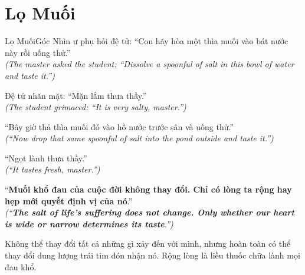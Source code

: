 \section{Lọ Muối}
\begin{truyen}{Lọ Muối}{Góc Nhìn}
ư phụ hỏi đệ tử: ``Con hãy hòa một thìa muối vào bát nước này rồi uống thử.''\\
\textit{(The master asked the student: ``Dissolve a spoonful of salt in this bowl of water and taste it.'')}

Đệ tử nhăn mặt: ``Mặn lắm thưa thầy.''\\
\textit{(The student grimaced: ``It is very salty, master.'')}

``Bây giờ thả thìa muối đó vào hồ nước trước sân và uống thử.''\\
\textit{(``Now drop that same spoonful of salt into the pond outside and taste it.'')}

``Ngọt lành thưa thầy.''\\
\textit{(``It tastes fresh, master.'')}

``\textbf{Muối khổ đau của cuộc đời không thay đổi. Chỉ có lòng ta rộng hay hẹp mới quyết định vị của nó}.''\\
\textit{(``\textbf{The salt of life's suffering does not change. Only whether our heart is wide or narrow determines its taste}.'')}
\end{truyen}
\begin{baihoc}
  Không thể thay đổi tất cả những gì xảy đến với mình, nhưng hoàn toàn có thể thay đổi dung lượng trái tim đón nhận nó. Rộng lòng là liều thuốc chữa lành mọi đau khổ.
\end{baihoc}

